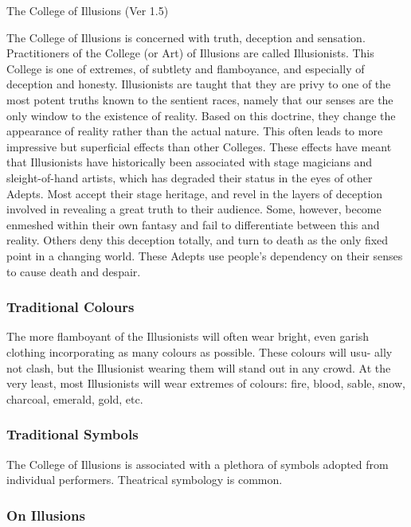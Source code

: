 \begin{Chapter}{The College of Illusions (Ver 1.5)}

The College of Illusions is concerned with truth, deception and
sensation.  Practitioners of the College (or Art) of Illusions are
called Illusionists.  This College is one of extremes, of subtlety and
flamboyance, and especially of deception and honesty.  Illusionists
are taught that they are privy to one of the most potent truths known
to the sentient races, namely that our senses are the only window to
the existence of reality.  Based on this doctrine, they change the
appearance of reality rather than the actual nature.  This often leads
to more impressive but superficial effects than other Colleges. These
effects have meant that Illusionists have historically been associated
with stage magicians and sleight-of-hand artists, which has degraded
their status in the eyes of other Adepts.  Most accept their stage
heritage, and revel in the layers of deception involved in revealing a
great truth to their audience.  Some, however, become enmeshed within
their own fantasy and fail to differentiate between this and reality.
Others deny this deception totally, and turn to death as the only
fixed point in a changing world. These Adepts use people’s dependency
on their senses to cause death and despair.

\subsubsection{Traditional Colours}

The more flamboyant of the Illusionists will often wear bright, even
garish clothing incorporating as many colours as possible.  These
colours will usu- ally not clash, but the Illusionist wearing them
will stand out in any crowd.  At the very least, most Illusionists
will wear extremes of colours: fire, blood, sable, snow, charcoal,
emerald, gold, etc.

\subsubsection{Traditional Symbols}

The College of Illusions is associated with a plethora of symbols
adopted from individual performers. Theatrical symbology is common.

\subsubsection{On Illusions}


\end{Chapter}
